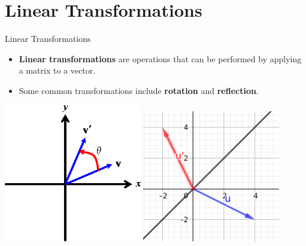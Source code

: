 \section{Linear Transformations}

\begin{frame}{Linear Transformations}
    \begin{itemize}
        \item \textbf{Linear transformations} are operations that can be performed by applying a matrix to a vector. 
        \item Some common transformations include \textbf{rotation} and \textbf{reflection}.
    \end{itemize}
    \begin{center}
        \includegraphics[width = 0.45\textwidth]{images/vector-rotation.png} 
        \includegraphics[width = 0.45\textwidth]{images/vector-reflection.png}
    \end{center}
\end{frame}

